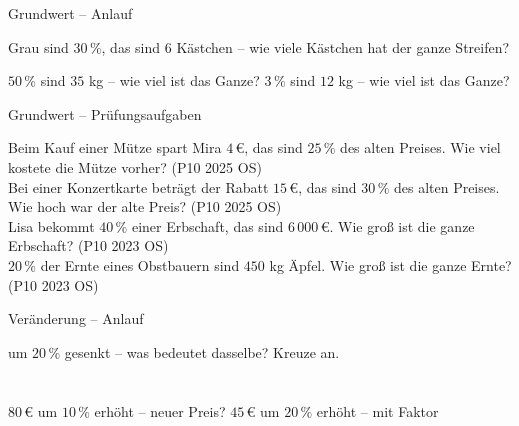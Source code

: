 \begin{aufgabe}{Grundwert – Anlauf}
\begin{teile}
\teil Grau sind $30\,\%$, das sind $6$ Kästchen – wie viele Kästchen hat der ganze Streifen?

\leerfeld[Kästchen]
\teil $50\,\%$ sind $35$ kg – wie viel ist das Ganze? \leerfeld[kg]
\teil $3\,\%$ sind $12$ kg – wie viel ist das Ganze? \leerfeld[kg]
\end{teile}
\end{aufgabe}

\begin{aufgabe}{Grundwert – Prüfungsaufgaben}
\begin{teile}
\teil Beim Kauf einer Mütze spart Mira $4\,€$, das sind $25\,\%$ des alten Preises. Wie viel kostete die Mütze vorher? \hfill (P10 2025 OS) \\ \leerfeld[€]
\teil Bei einer Konzertkarte beträgt der Rabatt $15\,€$, das sind $30\,\%$ des alten Preises. Wie hoch war der alte Preis? \hfill (P10 2025 OS) \\ \leerfeld[€]
\teil Lisa bekommt $40\,\%$ einer Erbschaft, das sind $6\,000\,€$. Wie groß ist die ganze Erbschaft? \hfill (P10 2023 OS) \\ \leerfeld[€]
\teil $20\,\%$ der Ernte eines Obstbauern sind $450$ kg Äpfel. Wie groß ist die ganze Ernte? \hfill (P10 2023 OS) \\ \leerfeld[kg]
\end{teile}
\end{aufgabe}

\begin{aufgabe}{Veränderung – Anlauf}
\begin{teile}
\teil um $20\,\%$ gesenkt – was bedeutet dasselbe? Kreuze an.\\ \\ \\ 
\teil $80\,€$ um $10\,\%$ erhöht – neuer Preis? \leerfeld[€]
\teil $45\,€$ um $20\,\%$ erhöht – mit Faktor \leerfeld[€]
\end{teile}
\end{aufgabe}

